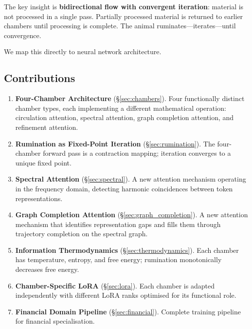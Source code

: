 \documentclass[twocolumn,10pt]{article}
\theoremstyle{remark}
\begin{document}
The key insight is \textbf{bidirectional flow with convergent iteration}: material is not processed in a single pass.  Partially processed material is returned to earlier chambers until processing is complete.  The animal ruminates---iterates---until convergence.

We map this directly to neural network architecture.

\subsection{Contributions}

\begin{enumerate}[label=\arabic*.]
    \item \textbf{Four-Chamber Architecture} (\S\ref{sec:chambers}).  Four functionally distinct chamber types, each implementing a different mathematical operation: circulation attention, spectral attention, graph completion attention, and refinement attention.

    \item \textbf{Rumination as Fixed-Point Iteration} (\S\ref{sec:rumination}).  The four-chamber forward pass is a contraction mapping; iteration converges to a unique fixed point.

    \item \textbf{Spectral Attention} (\S\ref{sec:spectral}).  A new attention mechanism operating in the frequency domain, detecting harmonic coincidences between token representations.

    \item \textbf{Graph Completion Attention} (\S\ref{sec:graph_completion}).  A new attention mechanism that identifies representation gaps and fills them through trajectory completion on the spectral graph.

    \item \textbf{Information Thermodynamics} (\S\ref{sec:thermodynamics}).  Each chamber has temperature, entropy, and free energy; rumination monotonically decreases free energy.

    \item \textbf{Chamber-Specific LoRA} (\S\ref{sec:lora}).  Each chamber is adapted independently with different LoRA ranks optimised for its functional role.

    \item \textbf{Financial Domain Pipeline} (\S\ref{sec:financial}).  Complete training pipeline for financial specialisation.
\end{enumerate}
\end{document}
